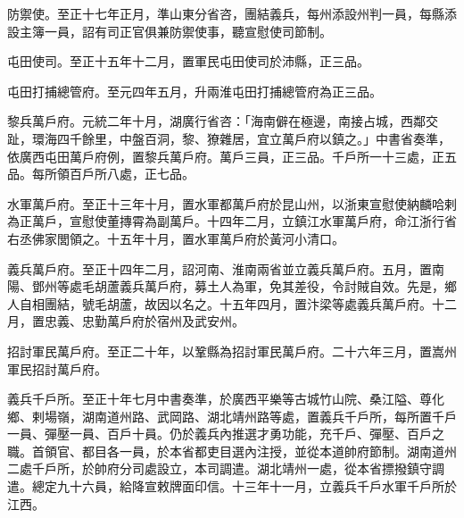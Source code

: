 \begin{pinyinscope}
 防禦使。至正十七年正月，準山東分省咨，團結義兵，每州添設州判一員，每縣添設主簿一員，詔有司正官俱兼防禦使事，聽宣慰使司節制。



 屯田使司。至正十五年十二月，置軍民屯田使司於沛縣，正三品。



 屯田打捕總管府。至元四年五月，升兩淮屯田打捕總管府為正三品。



 黎兵萬戶府。元統二年十月，湖廣行省咨：「海南僻在極邊，南接占城，西鄰交趾，環海四千餘里，中盤百洞，黎、獠雜居，宜立萬戶府以鎮之。」中書省奏準，依廣西屯田萬戶府例，置黎兵萬戶府。萬戶三員，正三品。千戶所一十三處，正五品。每所領百戶所八處，正七品。



 水軍萬戶府。至正十三年十月，置水軍都萬戶府於昆山州，以浙東宣慰使納麟哈剌為正萬戶，宣慰使董摶霄為副萬戶。十四年二月，立鎮江水軍萬戶府，命江浙行省右丞佛家閭領之。十五年十月，置水軍萬戶府於黃河小清口。



 義兵萬戶府。至正十四年二月，詔河南、淮南兩省並立義兵萬戶府。五月，置南陽、鄧州等處毛胡蘆義兵萬戶府，募土人為軍，免其差役，令討賊自效。先是，鄉人自相團結，號毛胡蘆，故因以名之。十五年四月，置汴梁等處義兵萬戶府。十二月，置忠義、忠勤萬戶府於宿州及武安州。



 招討軍民萬戶府。至正二十年，以鞏縣為招討軍民萬戶府。二十六年三月，置嵩州軍民招討萬戶府。



 義兵千戶所。至正十年七月中書奏準，於廣西平樂等古城竹山院、桑江隘、尊化鄉、剌場嶺，湖南道州路、武岡路、湖北靖州路等處，置義兵千戶所，每所置千戶一員、彈壓一員、百戶十員。仍於義兵內推選才勇功能，充千戶、彈壓、百戶之職。首領官、都目各一員，於本省都吏目選內注授，並從本道帥府節制。湖南道州二處千戶所，於帥府分司處設立，本司調遣。湖北靖州一處，從本省摽撥鎮守調遣。總定九十六員，給降宣敕牌面印信。十三年十一月，立義兵千戶水軍千戶所於江西。




\end{pinyinscope}
